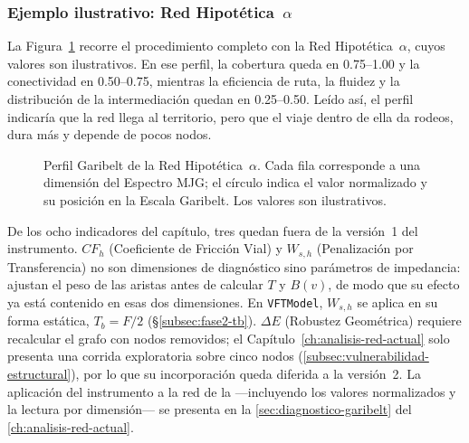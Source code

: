 
\subsubsection{Ejemplo ilustrativo: Red Hipotética~\texorpdfstring{$\alpha$}{α}}
\label{subsubsec:garibelt-ejemplo}

La Figura~\ref{fig:garibelt-perfil-hipotetico} recorre el procedimiento
completo con la Red Hipotética~$\alpha$, cuyos valores son ilustrativos. En ese
perfil, la cobertura queda en 0.75--1.00 y la conectividad en 0.50--0.75,
mientras la eficiencia de ruta, la fluidez y la distribución de la
intermediación quedan en 0.25--0.50. Leído así, el perfil indicaría que la red
llega al territorio, pero que el viaje dentro de ella da rodeos, dura más y
depende de pocos nodos.

\begin{figure}[htbp]
\centering

\caption[Perfil ilustrativo de la Clasificación Garibelt: Red Hipotética~$\alpha$]{%
    Perfil Garibelt de la Red Hipotética~$\alpha$. Cada fila corresponde a
    una dimensión del Espectro MJG; el círculo indica el valor normalizado
    y su posición en la Escala Garibelt. Los valores son ilustrativos.}
\label{fig:garibelt-perfil-hipotetico}
\end{figure}

De los ocho indicadores del capítulo, tres quedan fuera de la versión~1 del
instrumento. $CF_h$ (Coeficiente de Fricción Vial) y $W_{s,h}$ (Penalización por
Transferencia) no son dimensiones de diagnóstico sino parámetros de impedancia:
ajustan el peso de las aristas antes de calcular $T$ y $B(v)$, de modo que su
efecto ya está contenido en esas dos dimensiones. En \texttt{VFTModel},
$W_{s,h}$ se aplica en su forma estática, $T_b = F/2$
(§\ref{subsec:fase2-tb}). $\Delta E$ (Robustez Geométrica) requiere recalcular el
grafo con nodos removidos; el Capítulo~\ref{ch:analisis-red-actual} solo
presenta una corrida exploratoria sobre cinco nodos
(\autoref{subsec:vulnerabilidad-estructural}), por lo que su incorporación queda
diferida a la versión~2. La aplicación del instrumento a la red de la
\zmvm{} ---incluyendo los valores normalizados y la lectura por dimensión--- se
presenta en la \autoref{sec:diagnostico-garibelt} del
\autoref{ch:analisis-red-actual}.

